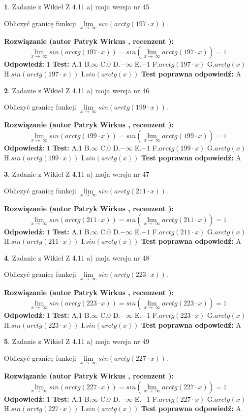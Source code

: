 \documentclass[12pt, a4paper]{article}
\theoremstyle{definition} %
\newtheorem{zad}{}
\newcommand{\zadStart}[1]{\begin{zad}#1\newline}
\newcommand{\zadStop}{\end{zad}}
\newcommand{\rozwStart}[2]{\noindent \textbf{Rozwiązanie (autor #1 , recenzent #2): }\newline}
\newcommand{\rozwStop}{\newline}
\newcommand{\odpStart}{\noindent \textbf{Odpowiedź:}\newline}
\newcommand{\odpStop}{\newline}
\newcommand{\testStart}{\noindent \textbf{Test:}\newline}
\newcommand{\testStop}{\newline}
\newcommand{\kluczStart}{\noindent \textbf{Test poprawna odpowiedź:}\newline}
\newcommand{\kluczStop}{\newline}
\begin{document}
\zadStart{Zadanie z Wikieł Z 4.11 a) moja wersja nr 45}

Obliczyć granicę funkcji  $\lim\limits_{x\to\ \infty}sin(arctg(197\cdot x))$.
\zadStop
\rozwStart{Patryk Wirkus}{}
$$\lim\limits_{x\to\ \infty}sin(arctg(197\cdot x)) = sin(\lim\limits_{x\to\ \infty}arctg(197\cdot x)) = 1$$
\rozwStop
\odpStart
$1$
\odpStop
\testStart
A.$1$ B.$\infty$ C.$0$ D.$-\infty$ E.$-1$
F.$arctg(197\cdot x)$ G.$arctg(x)$
H.$sin(arctg(197\cdot x))$
I.$sin(arctg(x))$
\testStop
\kluczStart
A
\kluczStop



\zadStart{Zadanie z Wikieł Z 4.11 a) moja wersja nr 46}

Obliczyć granicę funkcji  $\lim\limits_{x\to\ \infty}sin(arctg(199\cdot x))$.
\zadStop
\rozwStart{Patryk Wirkus}{}
$$\lim\limits_{x\to\ \infty}sin(arctg(199\cdot x)) = sin(\lim\limits_{x\to\ \infty}arctg(199\cdot x)) = 1$$
\rozwStop
\odpStart
$1$
\odpStop
\testStart
A.$1$ B.$\infty$ C.$0$ D.$-\infty$ E.$-1$
F.$arctg(199\cdot x)$ G.$arctg(x)$
H.$sin(arctg(199\cdot x))$
I.$sin(arctg(x))$
\testStop
\kluczStart
A
\kluczStop



\zadStart{Zadanie z Wikieł Z 4.11 a) moja wersja nr 47}

Obliczyć granicę funkcji  $\lim\limits_{x\to\ \infty}sin(arctg(211\cdot x))$.
\zadStop
\rozwStart{Patryk Wirkus}{}
$$\lim\limits_{x\to\ \infty}sin(arctg(211\cdot x)) = sin(\lim\limits_{x\to\ \infty}arctg(211\cdot x)) = 1$$
\rozwStop
\odpStart
$1$
\odpStop
\testStart
A.$1$ B.$\infty$ C.$0$ D.$-\infty$ E.$-1$
F.$arctg(211\cdot x)$ G.$arctg(x)$
H.$sin(arctg(211\cdot x))$
I.$sin(arctg(x))$
\testStop
\kluczStart
A
\kluczStop



\zadStart{Zadanie z Wikieł Z 4.11 a) moja wersja nr 48}

Obliczyć granicę funkcji  $\lim\limits_{x\to\ \infty}sin(arctg(223\cdot x))$.
\zadStop
\rozwStart{Patryk Wirkus}{}
$$\lim\limits_{x\to\ \infty}sin(arctg(223\cdot x)) = sin(\lim\limits_{x\to\ \infty}arctg(223\cdot x)) = 1$$
\rozwStop
\odpStart
$1$
\odpStop
\testStart
A.$1$ B.$\infty$ C.$0$ D.$-\infty$ E.$-1$
F.$arctg(223\cdot x)$ G.$arctg(x)$
H.$sin(arctg(223\cdot x))$
I.$sin(arctg(x))$
\testStop
\kluczStart
A
\kluczStop



\zadStart{Zadanie z Wikieł Z 4.11 a) moja wersja nr 49}

Obliczyć granicę funkcji  $\lim\limits_{x\to\ \infty}sin(arctg(227\cdot x))$.
\zadStop
\rozwStart{Patryk Wirkus}{}
$$\lim\limits_{x\to\ \infty}sin(arctg(227\cdot x)) = sin(\lim\limits_{x\to\ \infty}arctg(227\cdot x)) = 1$$
\rozwStop
\odpStart
$1$
\odpStop
\testStart
A.$1$ B.$\infty$ C.$0$ D.$-\infty$ E.$-1$
F.$arctg(227\cdot x)$ G.$arctg(x)$
H.$sin(arctg(227\cdot x))$
I.$sin(arctg(x))$
\testStop
\kluczStart
A
\kluczStop
\end{document}

